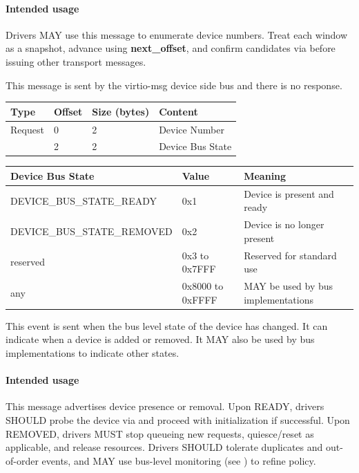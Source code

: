 \paragraph{Intended usage}
Drivers MAY use this message to enumerate device numbers. Treat each window as
a snapshot, advance using \textbf{next_offset}, and confirm candidates via
 before issuing other transport messages.


This message is sent by the virtio-msg device side bus and there is no response.

\begin{tabular}{|l|l|l|l|}
\hline
Type & Offset & Size (bytes) & Content \\
\hline \hline
Request & 0 & 2 & Device Number \\
        & 2 & 2 & Device Bus State \\
\hline
\end{tabular}

\begin{tabular}{|l|l|l|}
\hline
Device Bus State & Value & Meaning \\
\hline
\hline
DEVICE_BUS_STATE_READY      & 0x1  & Device is present and ready \\
\hline
DEVICE_BUS_STATE_REMOVED    & 0x2  & Device is no longer present \\
\hline
reserved          & 0x3 to 0x7FFF & Reserved for standard use \\
\hline
any               & 0x8000 to 0xFFFF & MAY be used by bus implementations \\
\hline
\end{tabular}

This event is sent when the bus level state of the device has changed.
It can indicate when a device is added or removed. It MAY also be used by
bus implementations to indicate other states.

\paragraph{Intended usage}
This message advertises device presence or removal. Upon READY, drivers SHOULD
probe the device via  and proceed with initialization
if successful. Upon REMOVED, drivers MUST stop queueing new requests,
quiesce/reset as applicable, and release resources. Drivers SHOULD tolerate
duplicates and out-of-order events, and MAY use bus-level monitoring (see
) to refine policy.

